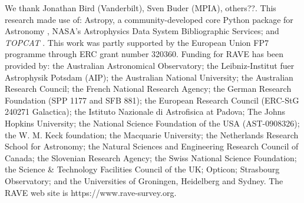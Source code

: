 \documentclass[preprint,trackchanges]{aastex}
\newcommand{\project}[1]{\textsl{#1}}
\begin{document}
\acknowledgements
We thank Jonathan Bird (Vanderbilt), Sven Buder (MPIA), others??.
This research made use of: Astropy, a community-developed core Python package for
Astronomy \citep{astropy}, NASA's Astrophysics Data System Bibliographic Services;
and \project{TOPCAT} \citep{Taylor_2005}.
This work was partly supported by the European Union FP7 programme through ERC 
grant number 320360.
Funding for RAVE has been provided by: the Australian Astronomical Observatory; 
the Leibniz-Institut fuer Astrophysik Potsdam (AIP); the Australian National 
University; the Australian Research Council; the French National Research Agency;
the German Research Foundation (SPP 1177 and SFB 881); the European Research 
Council (ERC-StG 240271 Galactica); the Istituto Nazionale di Astrofisica at 
Padova; The Johns Hopkins University; the National Science Foundation of the USA
(AST-0908326); the W. M. Keck foundation; the Macquarie University; the 
Netherlands Research School for Astronomy; the Natural Sciences and Engineering 
Research Council of Canada; the Slovenian Research Agency; the Swiss National 
Science Foundation; the Science \& Technology Facilities Council of the UK; 
Opticon; Strasbourg Observatory; and the Universities of Groningen, Heidelberg 
and Sydney. The RAVE web site is https://www.rave-survey.org.  
\end{document}
